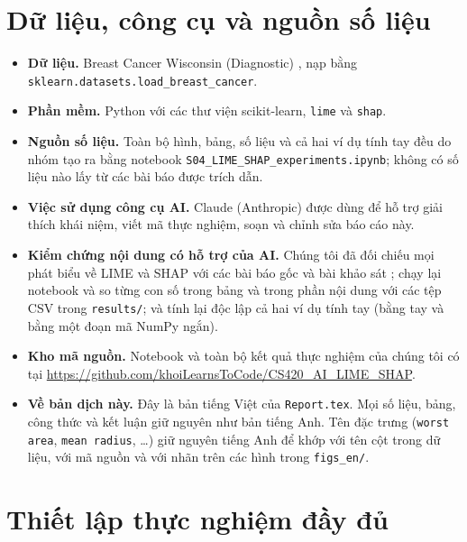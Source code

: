 \documentclass[11pt,a4paper]{article}
\newcommand{\code}[1]{\texttt{#1}}
\begin{document}
\section*{Dữ liệu, công cụ và nguồn số liệu}
\begin{itemize}
  \item \textbf{Dữ liệu.} Breast Cancer Wisconsin (Diagnostic) \cite{street},
        nạp bằng\\ \code{sklearn.datasets.load\_breast\_cancer}.
  \item \textbf{Phần mềm.} Python với các thư viện scikit-learn, \code{lime}
        và \code{shap}.
  \item \textbf{Nguồn số liệu.} Toàn bộ hình, bảng, số liệu và cả hai ví dụ
        tính tay đều do nhóm tạo ra bằng notebook
        \code{S04\_LIME\_SHAP\_}\allowbreak\code{experiments.ipynb}; không có
        số liệu nào lấy từ các bài báo được trích dẫn.
  \item \textbf{Việc sử dụng công cụ AI.} Claude (Anthropic) được dùng để hỗ
        trợ giải thích khái niệm, viết mã thực nghiệm, soạn và chỉnh sửa báo
        cáo này.
  \item \textbf{Kiểm chứng nội dung có hỗ trợ của AI.} Chúng tôi đã đối chiếu
        mọi phát biểu về LIME và SHAP với các bài báo gốc
        \cite{ribeiro}\cite{lundberg} và bài khảo sát \cite{mersha}; chạy lại
        notebook và so từng con số trong bảng và trong phần nội dung với các
        tệp CSV trong \code{results/}; và tính lại độc lập cả hai ví dụ tính
        tay (bằng tay và bằng một đoạn mã NumPy ngắn).
  \item \textbf{Kho mã nguồn.} Notebook và toàn bộ kết quả thực nghiệm của
        chúng tôi có tại
        \url{https://github.com/khoiLearnsToCode/CS420_AI_LIME_SHAP}.
  \item \textbf{Về bản dịch này.} Đây là bản tiếng Việt của \code{Report.tex}.
        Mọi số liệu, bảng, công thức và kết luận giữ nguyên như bản tiếng
        Anh. Tên đặc trưng (\code{worst area}, \code{mean radius}, \dots) giữ
        nguyên tiếng Anh để khớp với tên cột trong dữ liệu, với mã nguồn và
        với nhãn trên các hình trong \code{figs\_en/}.
\end{itemize}

\appendix
\section{Thiết lập thực nghiệm đầy đủ}\label{app:setup}
\end{document}
